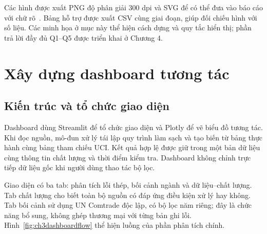 \documentclass[12pt,a4paper,oneside]{report}
\begin{document}
Các hình được xuất PNG độ phân giải 300 dpi và SVG để có thể đưa vào báo cáo với chữ rõ~\cite{matplotlib}. Bảng hỗ trợ được xuất CSV cùng giai đoạn, giúp đối chiếu hình với số liệu. Các minh họa ở mục này thể hiện cách dựng và quy tắc hiển thị; phần trả lời đầy đủ Q1--Q5 được triển khai ở Chương 4.

\section{Xây dựng dashboard tương tác}

\subsection{Kiến trúc và tổ chức giao diện}

Dashboard dùng Streamlit để tổ chức giao diện và Plotly để vẽ biểu đồ tương tác. Khi đọc nguồn, mô-đun xử lý tái lập quy trình làm sạch và tạo biến từ bảng thực hành cùng bảng tham chiếu UCI. Kết quả hợp lệ được giữ trong một bản dữ liệu cùng thông tin chất lượng và thời điểm kiểm tra. Dashboard không chỉnh trực tiếp dữ liệu gốc khi người dùng thao tác bộ lọc.

\begin{center}\begin{minipage}{\linewidth}
  \centering
  \begingroup
  \small
  \setlength{\fboxsep}{6pt}
  \endgroup
  \label{fig:ch3dashboardflow}
\end{minipage}\end{center}

Giao diện có ba tab: phân tích lỗi thép, bối cảnh ngành và dữ liệu--chất lượng. Tab chất lượng cho biết toàn bộ nguồn có đáp ứng điều kiện xử lý hay không. Tab bối cảnh sử dụng UN Comtrade độc lập, có bộ lọc năm riêng; đây là chức năng bổ sung, không ghép thương mại với từng bản ghi lỗi. Hình~\ref{fig:ch3dashboardflow} thể hiện luồng của phần phân tích chính.
\end{document}
